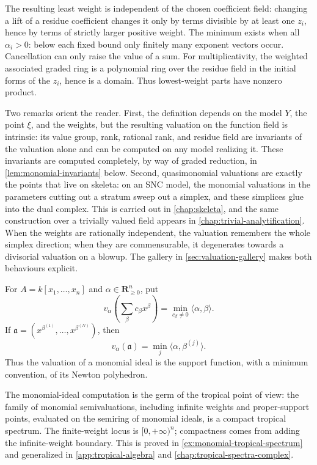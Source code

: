 The resulting least weight is independent of the chosen coefficient field:
changing a lift of a residue coefficient changes it only by terms divisible
by at least one $z_i$, hence by terms of strictly larger positive weight.
The minimum exists when all $\alpha_i>0$: below each fixed bound
only finitely many exponent vectors occur. Cancellation can only raise the
value of a sum. For multiplicativity, the weighted associated graded ring is
a polynomial ring over the residue field in the initial forms of the $z_i$,
hence is a domain. Thus lowest-weight parts have nonzero product.

Two remarks orient the reader. First, the definition depends on the model
$Y$, the point $\xi$, and the weights, but the resulting valuation on the
function field is intrinsic: its value group, rank, rational rank, and
residue field are invariants of the valuation alone and can be computed on
any model realizing it. These invariants are computed completely, by way of
graded reduction, in \cref{lem:monomial-invariants} below. Second,
quasimonomial valuations are exactly the points that live on skeleta: on an
SNC model, the monomial valuations in the parameters cutting out a stratum
sweep out a simplex, and these simplices glue into the dual complex. This
is carried out in \cref{chap:skeleta}, and the same construction over a
trivially valued field appears in \cref{chap:trivial-analytification}. When
the weights are rationally independent, the valuation remembers the whole
simplex direction; when they are commensurable, it degenerates towards a
divisorial valuation on a blowup. The gallery in
\cref{sec:valuation-gallery} makes both behaviours explicit.

\begin{example}\label{ex:monomial-ideal-valuation}
For $A=k[x_1,\ldots,x_n]$ and
$\alpha\in\mathbf R_{\geq0}^n$, put
\[
 v_\alpha\left(\sum_\beta c_\beta x^\beta\right)
       =\min_{c_\beta\ne0}\langle\alpha,\beta\rangle.
\]
If $\mathfrak a=(x^{\beta^{(1)}},\ldots,x^{\beta^{(N)}})$, then
\[
                  v_\alpha(\mathfrak a)
       =\min_j\langle\alpha,\beta^{(j)}\rangle.
\]
Thus the valuation of a monomial ideal is the support function, with a
minimum convention, of its Newton polyhedron.
\end{example}

The monomial-ideal computation is the germ of the tropical point of view:
the family of monomial semivaluations, including infinite weights and
proper-support points, evaluated on the semiring of monomial ideals, is a
compact tropical spectrum. The finite-weight locus is
$[0,+\infty)^n$; compactness comes from adding the infinite-weight
boundary. This is proved in
\cref{ex:monomial-tropical-spectrum} and generalized in
\cref{app:tropical-algebra} and \cref{chap:tropical-spectra-complex}.

